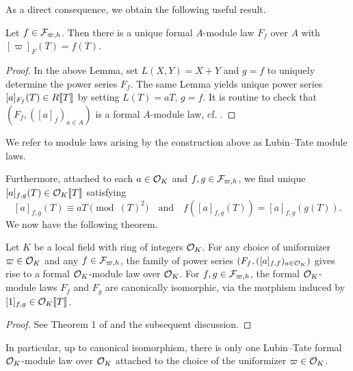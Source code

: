 \documentclass[../main.tex]{subfiles}
\begin{document}
As a direct consequence, we obtain the following useful result.
\begin{lem}
  Let $f \in \mathcal{F}_{\varpi, h}$. Then there is a unique formal $A$-module law $F_f$ over $A$
  with $[\varpi]_F(T) = f(T)$.
\begin{proof}
  In the above Lemma, set $L(X,Y) = X+Y$ and $g=f$ to uniquely determine 
  the power series $F_f$. The same Lemma yields unique power series
  $[a]_{F_f}(T) \in R\llbracket T \rrbracket$ by setting $L(T) = a T$, $g=f$. It is
  routine to check that $(F_f, ([a]_f)_{a \in A})$ is a formal $A$-module law, 
  cf. \cite{LubinTateFormalMult}.
\end{proof}
\end{lem}

\begin{defi}
  We refer to module laws arising by the construction above as Lubin--Tate module laws.
\end{defi}

Furthermore, attached to each $a \in \mathcal{O}_K$ and $f,g \in \mathcal{F}_{\varpi,h}$, we find
unique $[a]_{f,g}(T) \in \mathcal{O}_K\llbracket T \rrbracket$ satisfying
\begin{equation}\label{eq:LTMoLaScaCond}
  [a]_{f,g}(T) \equiv aT \pmod {(T)^2} \quad \text{and} \quad
  f([a]_{f,g}(T)) = [a]_{f,g}(g(T)).
\end{equation}
We now have the following theorem.
\begin{thm}\label{thm:LTModLaw}
  Let $K$ be a local field with ring of integers $\mathcal{O}_K$. For any choice of 
  uniformizer $\varpi \in \mathcal{O}_K$ and any $f \in \mathcal{F}_{\varpi,h}$, the family of power
  series $(F_f, ([a]_{f,f})_{a \in \mathcal{O}_K})$
  gives rise to a formal $\mathcal{O}_K$-module law over $\mathcal{O}_K$. For 
  $f,g \in \mathcal{F}_{\varpi,h}$, the formal $\mathcal{O}_K$-module laws $F_f$ and $F_g$ are
  canonically isomorphic, via the morphism induced by $[1]_{f,g} \in \mathcal{O}_K\llbracket
  T \rrbracket$. 
\begin{proof}
  See Theorem 1 of \cite{LubinTateFormalMult} and the subsequent discussion.
\end{proof}
\end{thm}
In particular, up to canonical isomorphism, there is only one Lubin--Tate formal
$\mathcal{O}_K$-module law over $\mathcal{O}_K$ attached to the choice of the uniformizer $\varpi \in
\mathcal{O}_K$. 
\end{document}
